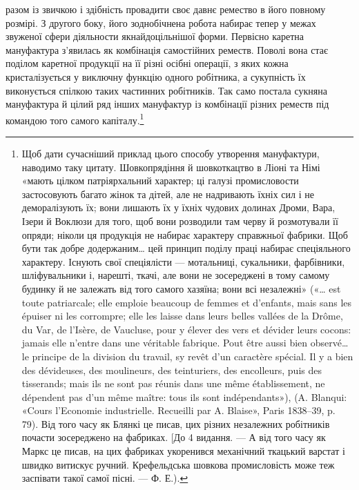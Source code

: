 \parcont{}  %
разом із звичкою і здібність провадити своє давнє ремество в
його повному розмірі. З другого боку, його зоднобічнена робота
набирає тепер у межах звуженої сфери діяльности якнайдоцільнішої
форми. Первісно каретна мануфактура з’явилась як комбінація
самостійних реместв. Поволі вона стає поділом каретної
продукції на її різні осібні операції, з яких кожна кристалізується
у виключну функцію одного робітника, а сукупність їх
виконується спілкою таких частинних робітників. Так само
постала сукняна мануфактура й цілий ряд інших мануфактур
із комбінації різних реместв під командою того самого капіталу.\footnote{
Щоб дати сучасніший приклад цього способу утворення мануфактури,
наводимо таку цитату. Шовкопрядіння й шовкоткацтво в
Ліоні та Німі «мають цілком патріярхальний характер; ці галузі промисловости
застосовують багато жінок та дітей, але не надривають їхніх
сил і не деморалізують їх; вони лишають їх у їхніх чудових долинах Дроми,
Вара, Ізери й Воклюзи для того, щоб вони розводили там черву й розмотували
її опряди; ніколи ця продукція не набирає характеру справжньої
фабрики. Щоб бути так добре додержаним\dots{} цей принцип поділу праці
набирає спеціяльного характеру. Існують свої спеціялісти — мотальниці,
сукальники, фарбівники, шліфувальники і, нарешті, ткачі, але вони не
зосереджені в тому самому будинку й не залежать від того самого хазяїна;
вони всі незалежні» («\dots{} est toute patriarcale; elle emploie beaucoup de
femmes et d’enfants, mais sans les épuiser ni les corrompre; elle les laisse
dans leurs belles vallées de la Drôme, du Var, de l’Isère, de Vaucluse, pour
y élever des vers et dévider leurs cocons: jamais elle n’entre dans une véritable
fabrique. Pout être aussi bien observé\dots{} le principe de la division
du travail, sy revêt d’un caractère spécial. Il y a bien des dévideuses, des
moulineurs, des teinturiers, des encolleurs, puis des tisserands; mais ils
ne sont pas réunis dans une même établissement, ne dépendent pas d’un
même maître: tous ils sont indépendants»), (A. Blanqui: «Cours l'Economie
industrielle. Recueilli par A. Blaise», Paris 1838--39, p. 79).
Від того часу як Блянкі це писав, цих різних незалежних робітників
почасти зосереджено на фабриках. [До 4 видання. — А від того часу
як Маркс це писав, на цих фабриках укоренився механічний ткацький
варстат і швидко витискує ручний. Крефельдська шовкова промисловість
може теж заспівати такої самої пісні. — Ф. Е.).
}

